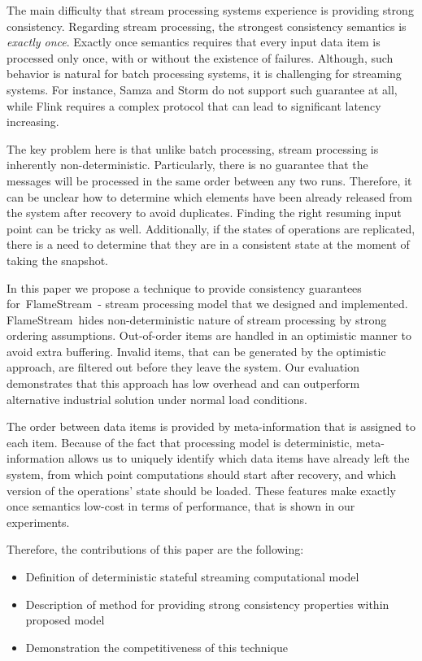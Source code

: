 \documentclass{llncs}
\newcommand {\FlameStream} {FlameStream}
\begin{document}
The main difficulty that stream processing systems experience is providing strong consistency. Regarding stream processing, the strongest consistency semantics is {\it exactly once}. Exactly once semantics requires that every input data item is processed only once, with or without the existence of failures. Although, such behavior is natural for batch processing systems, it is challenging for streaming systems. For instance, Samza and Storm do not support such guarantee at all, while Flink requires a complex protocol that can lead to significant latency increasing.

The key problem here is that unlike batch processing, stream processing is inherently non-deterministic. Particularly, there is no guarantee that the messages will be processed in the same order between any two runs. Therefore, it can be unclear how to determine which elements have been already released from the system after recovery to avoid duplicates. Finding the right resuming input point can be tricky as well. Additionally, if the states of operations are replicated, there is a need to determine that they are in a consistent state at the moment of taking the snapshot. 

In this paper we propose a technique to provide consistency guarantees for~\FlameStream\ - stream processing model that we designed and implemented. \FlameStream\ hides non-deterministic nature of stream processing by strong ordering assumptions. Out-of-order items are handled in an optimistic manner to avoid extra buffering. Invalid items, that can be generated by the optimistic approach, are filtered out before they leave the system. Our evaluation demonstrates that this approach has low overhead and can outperform alternative industrial solution under normal load conditions.

The order between data items is provided by meta-information that is assigned to each item. Because of the fact that processing model is deterministic, meta-information allows us to uniquely identify which data items have already left the system, from which point computations should start after recovery, and which version of the operations' state should be loaded. These features make exactly once semantics low-cost in terms of performance, that is shown in our experiments.

Therefore, the contributions of this paper are the following: 

\begin {itemize}
\item Definition of deterministic stateful streaming computational model 
\item Description of method for providing strong consistency properties within proposed model 
\item Demonstration the competitiveness of this technique
\end {itemize}
\end{document}
